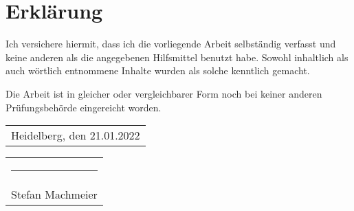 \thispagestyle{empty}
\setlength{\parindent}{0em}

\chapter*{Erklärung}
\thispagestyle{empty}

\vspace{3\baselineskip}
Ich versichere hiermit, dass ich die vorliegende Arbeit selbständig verfasst und keine anderen als die angegebenen Hilfsmittel benutzt habe. 
Sowohl inhaltlich als auch wörtlich entnommene Inhalte wurden als solche kenntlich gemacht.

Die Arbeit ist in gleicher oder vergleichbarer Form noch bei keiner anderen Prüfungsbehörde eingereicht worden.
\vspace{5\baselineskip}

\begin{tabular}[t]{c}
    Heidelberg, den 21.01.2022
\end{tabular}
\hfill
\begin{tabular}[t]{c}
    \rule{15em}{0.4pt} \\ Stefan Machmeier
\end{tabular}
